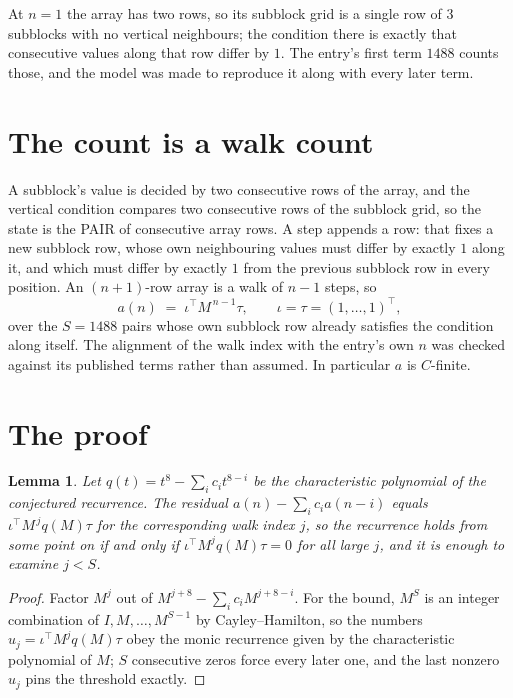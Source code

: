 \documentclass[11pt,a4paper]{article}
\theoremstyle{plain}
\newtheorem{lemma}[theorem]{Lemma}
\theoremstyle{definition}
\begin{document}
At $n=1$ the array has two rows, so its subblock grid is a single row of $3$ subblocks with
no vertical neighbours; the condition there is exactly that consecutive values along that row
differ by $1$. The entry's first term $1488$ counts those, and the model was made to
reproduce it along with every later term.

\section{The count is a walk count}

A subblock's value is decided by two consecutive rows of the array, and the
vertical condition compares two consecutive rows of the subblock grid, so the state is the
PAIR of consecutive array rows. A step appends a row: that fixes a new subblock row, whose own
neighbouring values must differ by exactly $1$ along it, and which must differ by exactly
$1$ from the previous subblock row in every position. An $(n+1)$-row array is a walk of
$n-1$ steps, so
\[
a(n)\;=\;\iota^{\!\top}M^{\,n-1}\tau,\qquad\iota=\tau=(1,\dots,1)^{\!\top},
\]
over the $S=1488$ pairs whose own subblock row already satisfies the condition along itself.
The alignment of the walk index with the entry's own $n$ was checked against its published
terms rather than assumed. In particular $a$ is $C$-finite.

\section{The proof}

\begin{lemma}\label{lem:crit}
Let $q(t)=t^{8}-\sum_i c_it^{8-i}$ be the characteristic polynomial of the
conjectured recurrence. The residual $a(n)-\sum_ic_ia(n-i)$ equals
$\iota^{\!\top}M^{\,j}q(M)\tau$ for the corresponding walk index $j$, so the recurrence
holds from some point on if and only if $\iota^{\!\top}M^{j}q(M)\tau=0$ for all large $j$,
and it is enough to examine $j<S$.
\end{lemma}

\begin{proof}
Factor $M^{j}$ out of $M^{j+8}-\sum_ic_iM^{j+8-i}$. For the bound, $M^{S}$
is an integer combination of $I,M,\dots,M^{S-1}$ by Cayley--Hamilton, so the numbers
$u_j=\iota^{\!\top}M^{j}q(M)\tau$ obey the monic recurrence given by the characteristic
polynomial of $M$; $S$ consecutive zeros force every later one, and the last nonzero $u_j$
pins the threshold exactly.
\end{proof}
\end{document}
